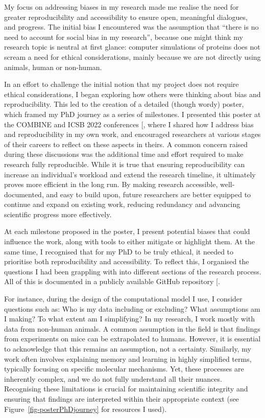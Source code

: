 \documentclass[
  11pt,
  letterpaper,
]{scrreprt}
\begin{document}
My focus on addressing biases in my research made me realise the need
for greater reproducibility and accessibility to ensure open, meaningful
dialogues, and progress. The initial bias I encountered was the
assumption that ``there is no need to account for social bias in my
research'', because one might think my research topic is neutral at
first glance: computer simulations of proteins does not scream a need
for ethical considerations, mainly because we are not directly using
animals, human or non-human.

In an effort to challenge the initial notion that my project does not
require ethical considerations, I began exploring how others were
thinking about bias and reproducibility. This led to the creation of a
detailed (though wordy) poster, which framed my PhD journey as a series
of milestones. I presented this poster at the COMBINE and ICSB 2022
conferences {[}\citeproc{ref-romangarcia2022Biasa}{425}{]}, where I
shared how I address bias and reproducibility in my own work, and
encouraged researchers at various stages of their careers to reflect on
these aspects in theirs. A common concern raised during these
discussions was the additional time and effort required to make research
fully reproducible. While it is true that ensuring reproducibility can
increase an individual's workload and extend the research timeline, it
ultimately proves more efficient in the long run. By making research
accessible, well-documented, and easy to build upon, future researchers
are better equipped to continue and expand on existing work, reducing
redundancy and advancing scientific progress more effectively.

At each milestone proposed in the poster, I present potential biases
that could influence the work, along with tools to either mitigate or
highlight them. At the same time, I recognised that for my PhD to be
truly ethical, it needed to prioritise both reproducibility and
accessibility. To reflect this, I organised the questions I had been
grappling with into different sections of the research process. All of
this is documented in a publicly available GitHub repository
{[}\citeproc{ref-romangarcia2022Biasa}{425}{]}.

For instance, during the design of the computational model I use, I
consider questions such as: Who is my data including or excluding? What
assumptions am I making? To what extent am I simplifying? In my
research, I work mostly with data from non-human animals. A common
assumption in the field is that findings from experiments on mice can be
extrapolated to humans. However, it is essential to acknowledge that
this remains an assumption, not a certainty. Similarly, my work often
involves explaining memory and learning in highly simplified terms,
typically focusing on specific molecular mechanisms. Yet, these
processes are inherently complex, and we do not fully understand all
their nuances. Recognising these limitations is crucial for maintaining
scientific integrity and ensuring that findings are interpreted within
their appropriate context (see Figure~\ref{fig-posterPhDjourney} for
resources I used).
\end{document}
